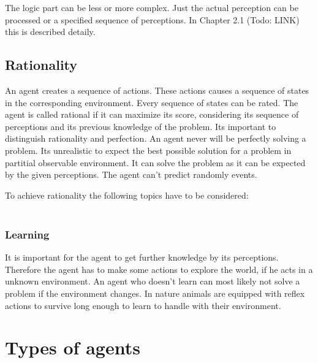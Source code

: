 \documentclass[10pt,a4paper,DIV=11]{scrreprt}
\begin{document}
The logic part can be less or more complex. Just the actual perception can be processed or a specified sequence of perceptions. In Chapter 2.1 (Todo: LINK) this is described detaily.

\subsection{Rationality}
An agent creates a sequence of actions. These actions causes a sequence of states in the corresponding environment. Every sequence of states can be rated. The agent is called rational if it can maximize its score, considering its sequence of perceptions and its previous knowledge of the problem. Its important to distinguish rationality and perfection. An agent never will be perfectly solving a problem. Its unrealistic to expect the best possible solution for a problem in partitial observable environment. It can solve the problem as it can be expected by the given perceptions. The agent can't predict randomly events.

To achieve rationality the following topics have to be considered: \\

   \\

\subsubsection{Learning}
It is important for the agent to get further knowledge by its perceptions. Therefore the agent has to make some actions to explore the world, if he acts in a unknown environment.
An agent who doesn't learn can most likely not solve a problem if the environment changes.
In nature animals are equipped with reflex actions to survive long enough to learn to handle with their environment.

\section{Types of agents}
\end{document}
